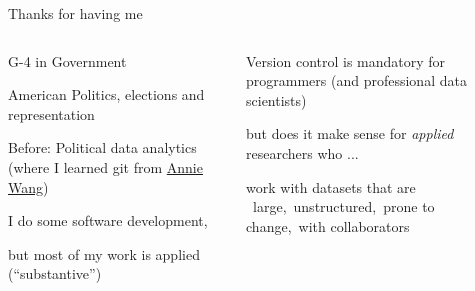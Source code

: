 \documentclass[ignorenonframetext,notes, 10pt, aspectratio=169]{beamer}
\begin{document}
\begin{frame}{Thanks for having me}

\begin{columns}[T]

\begin{column}{0.5\textwidth}
\begin{wideitemize}
\item G-4 in Government
\item American Politics, elections and representation
\item Before: Political data analytics (where I learned git from \href{https://anniejw.com/}{Annie Wang})
\end{wideitemize}\pause

\begin{wideitemize}
\item I do some software development, 
\item but most of my work is applied (``substantive'')
\end{wideitemize}
\end{column}\pause
\begin{column}{0.5\textwidth}
\begin{wideitemize}
\item Version control is mandatory for programmers (and professional data scientists)\pause
\item but does it make sense for \emph{applied} researchers who ...
\item work with datasets that are \pause ~\alert{large},\pause ~\alert{unstructured},\pause ~\alert{prone to change},\pause ~\alert{with collaborators}
\end{wideitemize}
\end{column}
\end{columns}
\end{frame}
\end{document}

